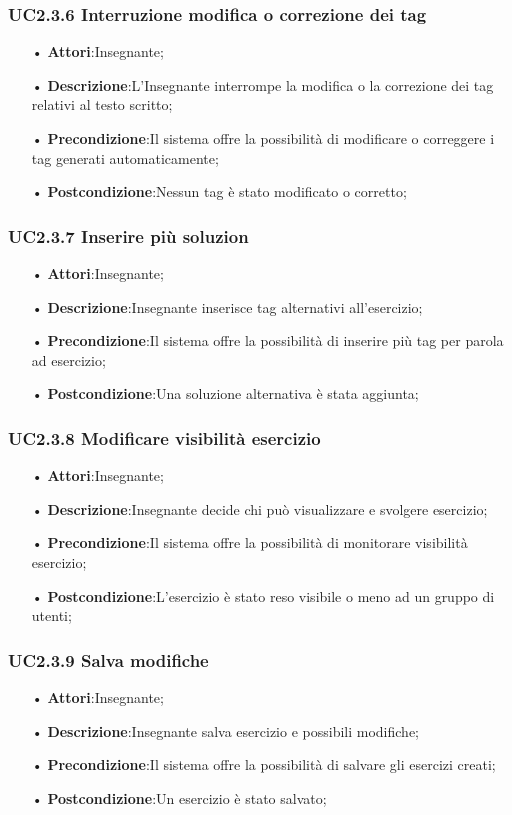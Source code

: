 \subsubsection{UC2.3.6 Interruzione modifica o correzione dei tag}
\begin{itemize}
	\item[•] \textbf{Attori}:Insegnante;
	\item[•] \textbf{Descrizione}:L’Insegnante interrompe la modifica o la correzione dei tag relativi al testo scritto;
	\item[•] \textbf{Precondizione}:Il sistema offre la possibilità di modificare o correggere i tag generati automaticamente;
	\item[•] \textbf{Postcondizione}:Nessun tag è stato modificato o corretto;
\end{itemize}

\subsubsection{UC2.3.7	Inserire più soluzion}
\begin{itemize}
	\item[•] \textbf{Attori}:Insegnante;
	\item[•] \textbf{Descrizione}:Insegnante inserisce tag alternativi all’esercizio;
	\item[•] \textbf{Precondizione}:Il sistema offre la possibilità di inserire più tag per parola ad 
			esercizio;
	\item[•] \textbf{Postcondizione}:Una soluzione alternativa è stata aggiunta;
\end{itemize}

\subsubsection{UC2.3.8	Modificare visibilità esercizio}
\begin{itemize}
	\item[•] \textbf{Attori}:Insegnante;
	\item[•] \textbf{Descrizione}:Insegnante decide chi può visualizzare e svolgere esercizio;
	\item[•] \textbf{Precondizione}:Il sistema offre la possibilità di monitorare visibilità esercizio;
	\item[•] \textbf{Postcondizione}:L’esercizio è stato reso visibile o meno ad un gruppo di utenti;	
\end{itemize}

\subsubsection{UC2.3.9	Salva modifiche}
\begin{itemize}
	\item[•] \textbf{Attori}:Insegnante;
	\item[•] \textbf{Descrizione}:Insegnante salva esercizio e possibili modifiche;
	\item[•] \textbf{Precondizione}:Il sistema offre la possibilità di salvare gli esercizi creati;
	\item[•] \textbf{Postcondizione}:Un esercizio è stato salvato;
\end{itemize}


